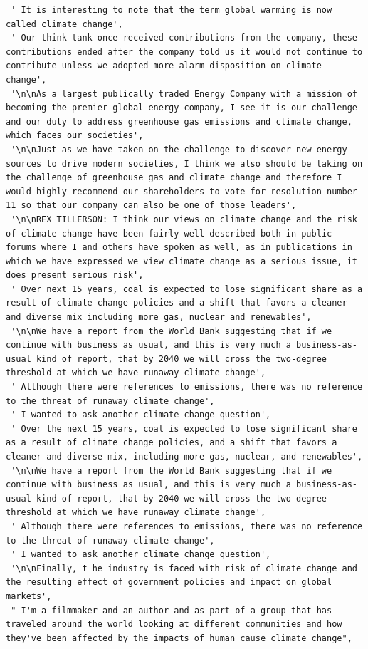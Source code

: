 \documentclass[
  letterpaper,
  DIV=11,
  numbers=noendperiod]{scrreprt}
\begin{document}
\begin{verbatim}
 ' It is interesting to note that the term global warming is now called climate change',
 ' Our think-tank once received contributions from the company, these contributions ended after the company told us it would not continue to contribute unless we adopted more alarm disposition on climate change',
 '\n\nAs a largest publically traded Energy Company with a mission of becoming the premier global energy company, I see it is our challenge and our duty to address greenhouse gas emissions and climate change, which faces our societies',
 '\n\nJust as we have taken on the challenge to discover new energy sources to drive modern societies, I think we also should be taking on the challenge of greenhouse gas and climate change and therefore I would highly recommend our shareholders to vote for resolution number 11 so that our company can also be one of those leaders',
 '\n\nREX TILLERSON: I think our views on climate change and the risk of climate change have been fairly well described both in public forums where I and others have spoken as well, as in publications in which we have expressed we view climate change as a serious issue, it does present serious risk',
 ' Over next 15 years, coal is expected to lose significant share as a result of climate change policies and a shift that favors a cleaner and diverse mix including more gas, nuclear and renewables',
 '\n\nWe have a report from the World Bank suggesting that if we continue with business as usual, and this is very much a business-as-usual kind of report, that by 2040 we will cross the two-degree threshold at which we have runaway climate change',
 ' Although there were references to emissions, there was no reference to the threat of runaway climate change',
 ' I wanted to ask another climate change question',
 ' Over the next 15 years, coal is expected to lose significant share as a result of climate change policies, and a shift that favors a cleaner and diverse mix, including more gas, nuclear, and renewables',
 '\n\nWe have a report from the World Bank suggesting that if we continue with business as usual, and this is very much a business-as-usual kind of report, that by 2040 we will cross the two-degree threshold at which we have runaway climate change',
 ' Although there were references to emissions, there was no reference to the threat of runaway climate change',
 ' I wanted to ask another climate change question',
 '\n\nFinally, t he industry is faced with risk of climate change and the resulting effect of government policies and impact on global markets',
 " I'm a filmmaker and an author and as part of a group that has traveled around the world looking at different communities and how they've been affected by the impacts of human cause climate change",

\end{verbatim}
\end{document}
